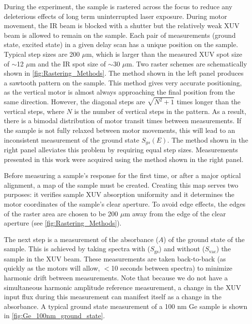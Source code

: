 During the experiment, the sample is rastered across the focus to reduce any deleterious effects of long term uninterrupted laser exposure. During motor movement, the IR beam is blocked with a shutter but the relatively weak XUV beam is allowed to remain on the sample. Each pair of measurements (ground state, excited state) in a given delay scan has a unique position on the sample. Typical step sizes are 200 $\mu$m, which is larger than the measured XUV spot size of $\sim$12 $\mu$m and the IR spot size of $\sim$30 $\mu$m. Two raster schemes are schematically shown in \cref{fig:Rastering_Methods}. The method shown in the left panel produces a sawtooth pattern on the sample. This method gives very accurate positioning, as the vertical motor is almost always approaching the final position from the same direction. However, the diagonal steps are $\sqrt{N^2+1}$ times longer than the vertical steps, where $N$ is the number of vertical steps in the pattern. As a result, there is a bimodal distribution of motor transit times between measurements. If the sample is not fully relaxed between motor movements, this will lead to an inconsistent measurement of the ground state $S_{gs}(E)$. The method shown in the right panel alleviates this problem by requiring equal step sizes. Measurements presented in this work were acquired using the method shown in the right panel.

Before measuring a sample's response for the first time, or after a major optical alignment, a map of the sample must be created. Creating this map serves two purposes: it verifies sample XUV absorption uniformity and it determines the motor coordinates of the sample's clear aperture. To avoid edge effects, the edges of the raster area are chosen to be 200 $\mu$m away from the edge of the clear aperture (see \cref{fig:Rastering_Methods}).

The next step is a measurement of the absorbance ($A$) of the ground state of the sample. This is achieved by taking spectra with ($S_{\text{gs}}$) and without ($S_{\text{vac}}$) the sample in the XUV beam. These measurements are taken back-to-back (as quickly as the motors will allow, $<$10 seconds between spectra) to minimize harmonic drift between measurements. Note that because we do not have a simultaneous harmonic amplitude reference measurement, a change in the XUV input flux during this measurement can manifest itself as a change in the absorbance. A typical ground state measurement of a 100 nm Ge sample is shown in \cref{fig:Ge_100nm_ground_state}.

